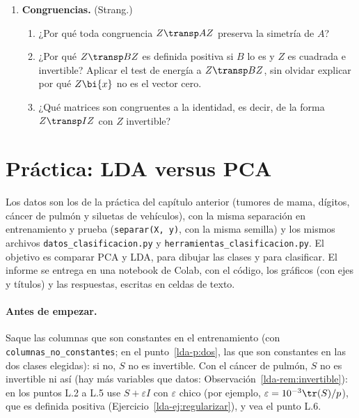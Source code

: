 \begin{enumerate}[leftmargin=*,label=\textbf{\thechapter.\arabic*},ref=\thechapter.\arabic*,itemsep=4pt]
\item {} \textbf{Congruencias.}\label{lda-ej:congruencias} (Strang.)
\begin{enumerate}[label=(\alph*)]
\item ¿Por qué toda congruencia $Z\transp AZ$ preserva la simetría de $A$?
\item ¿Por qué $Z\transp BZ$ es definida positiva si $B$ lo es y $Z$ es cuadrada
e invertible? Aplicar el test de energía a $Z\transp BZ$, sin olvidar explicar
por qué $Z\bi{x}$ no es el vector cero.
\item ¿Qué matrices son congruentes a la identidad, es decir, de la forma
$Z\transp IZ$ con $Z$ invertible?
\end{enumerate}

\end{enumerate}

\section*{Práctica: LDA versus PCA}

Los datos son los de la práctica del capítulo anterior (tumores de mama,
dígitos, cáncer de pulmón y siluetas de vehículos), con la misma separación en
entrenamiento y prueba (\texttt{separar(X, y)}, con la misma semilla) y los
mismos archivos \texttt{datos\_clasificacion.py} y
\texttt{herramientas\_clasificacion.py}. El objetivo es comparar PCA y LDA,
para dibujar las clases y para clasificar. El informe se entrega en una
notebook de Colab, con el código, los gráficos (con ejes y títulos) y las
respuestas, escritas en celdas de texto.

\paragraph{Antes de empezar.} Saque las columnas que son constantes en el
entrenamiento (con \texttt{columnas\_no\_constantes}; en el punto~\ref{lda-p:dos},
las que son constantes en las dos clases elegidas): si no, $S$ no es
invertible. Con el cáncer de pulmón, $S$ no es invertible ni así (hay más
variables que datos: Observación~\ref{lda-rem:invertible}): en los puntos L.2 a
L.5 use $S+\varepsilon I$ con $\varepsilon$ chico (por ejemplo,
$\varepsilon=10^{-3}\tr(S)/p$), que es definida positiva
(Ejercicio~\ref{lda-ej:regularizar}), y vea el punto L.6.

